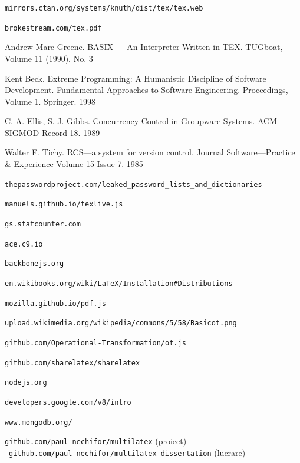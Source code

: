\documentclass[a4wide,12pt]{report}
\newcommand{\url}[1]{\texttt{#1}}
\begin{document}
\begin{thebibliography}{1}

\url{mirrors.ctan.org/systems/knuth/dist/tex/tex.web}

\url{brokestream.com/tex.pdf}

Andrew Marc Greene. BASIX --- An Interpreter Written in TEX. TUGboat, Volume 11 (1990). No. 3

Kent Beck. Extreme Programming: A Humanistic Discipline of Software Development.
Fundamental Approaches to Software Engineering. Proceedings, Volume 1. Springer. 1998

C. A. Ellis, S. J. Gibbs. Concurrency Control in Groupware Systems. ACM SIGMOD Record 18. 1989

Walter F. Tichy. RCS—a system for version control. Journal
Software—Practice \& Experience Volume 15 Issue 7. 1985

\url{thepasswordproject.com/leaked\_password\_lists\_and\_dictionaries}

\url{manuels.github.io/texlive.js}

\url{gs.statcounter.com}

\url{ace.c9.io}

\url{backbonejs.org}

\url{en.wikibooks.org/wiki/LaTeX/Installation\#Distributions}

\url{mozilla.github.io/pdf.js}

\url{upload.wikimedia.org/wikipedia/commons/5/58/Basicot.png}

\url{github.com/Operational-Transformation/ot.js}

\url{github.com/sharelatex/sharelatex}

\url{nodejs.org}

\url{developers.google.com/v8/intro}

\url{www.mongodb.org/}

\url{github.com/paul-nechifor/multilatex} (proiect) \\
\mbox{ }\url{github.com/paul-nechifor/multilatex-dissertation} (lucrare)

\end{thebibliography}
\end{document}
